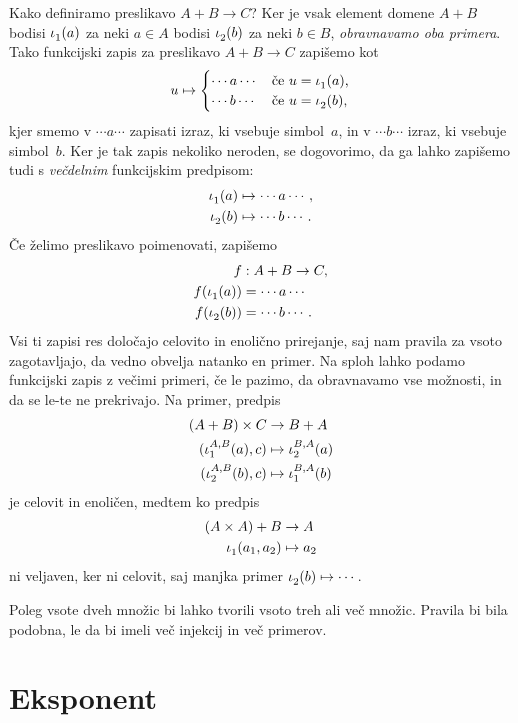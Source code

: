 Kako definiramo preslikavo $A + B \to C$? Ker je vsak element domene $A + B$ bodisi
$\inl(a)$ za neki $a \in A$ bodisi $\inr(b)$ za neki $b \in B$, \emph{obravnavamo oba
  primera}. Tako funkcijski zapis za preslikavo $A + B \to C$ zapišemo kot
%
\begin{equation*}
  u \mapsto
  \begin{cases}
    \cdots a \cdots & \text{če $u = \inl(a)$,}\\
    \cdots b \cdots & \text{če $u = \inr(b)$,}
  \end{cases}
\end{equation*}
%
kjer smemo v $\cdots a \cdots$ zapisati izraz, ki vsebuje simbol~$a$, in v
$\cdots b \cdots$ izraz, ki vsebuje simbol~$b$. Ker je tak zapis nekoliko neroden, se
dogovorimo, da ga lahko zapišemo tudi s \emph{večdelnim} funkcijskim predpisom:
%
\begin{align*}
  \inl(a) &\mapsto \cdots a \cdots, \\
  \inr(b) &\mapsto \cdots b \cdots.
\end{align*}
%
Če želimo preslikavo poimenovati, zapišemo
%
\begin{align*}
  f &: A + B \to C, \\
  f(\inl(a)) &= \cdots a \cdots \\
  f(\inr(b)) &= \cdots b \cdots.
\end{align*}
%
Vsi ti zapisi res določajo celovito in enolično prirejanje, saj nam pravila za vsoto
zagotavljajo, da vedno obvelja natanko en primer. Na sploh lahko podamo funkcijski zapis z
večimi primeri, če le pazimo, da obravnavamo vse možnosti, in da se le-te ne prekrivajo.
Na primer, predpis
%
\begin{align*}
  (A + B) \times C &\to B + A \\
  (\inl[A][B](a), c) &\mapsto \inr[B][A](a) \\
  (\inr[A][B](b), c) &\mapsto \inl[B][A](b)
\end{align*}
%
je celovit in enoličen, medtem ko predpis
%
\begin{align*}
  (A \times A) + B &\to A \\
  \inl(a_1, a_2) &\mapsto a_2
\end{align*}
%
ni veljaven, ker ni celovit, saj manjka primer $\inr(b) \mapsto \cdots$.

Poleg vsote dveh množic bi lahko tvorili vsoto treh ali več množic. Pravila bi bila
podobna, le da bi imeli več injekcij in več primerov.

\section{Eksponent}
\label{sec:eksponent}

